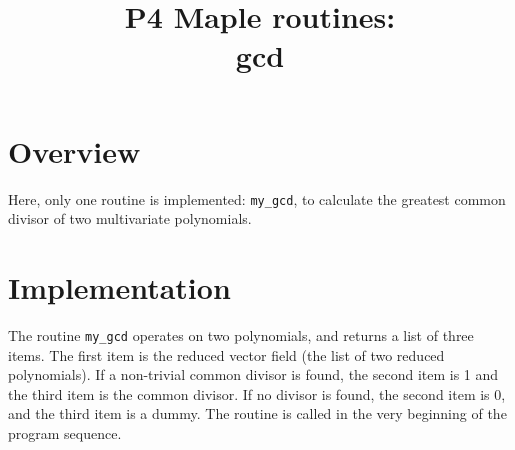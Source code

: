\documentclass[a4paper,10pt]{article}
\title{P4 Maple routines:\\gcd}
\author{}
\date{}
\begin{document}
\maketitle

\section{Overview}

Here, only one routine is implemented: \verb+my_gcd+, to calculate the greatest common divisor
of two multivariate polynomials.

\section{Implementation}

The routine \verb+my_gcd+ operates on two polynomials, and returns a list of three items.  The first
item is the reduced vector field (the list of two reduced polynomials).  If a non-trivial common
divisor is found, the second item is 1 and the third item is the common divisor.  If no divisor is
found, the second item is 0, and the third item is a dummy.  The routine is called in the very
beginning of the program sequence.
\end{document}
